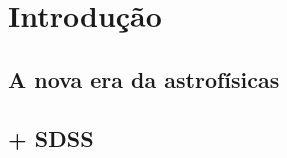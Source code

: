 


\chapter{Introdução}
\label{sec:Intro}


\section{A nova era da astrofísicas}



\section{\starlight + SDSS}
\label{sec:Intro:Starlight}





